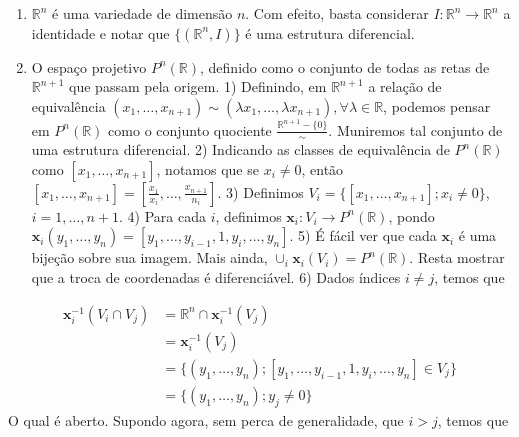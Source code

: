 \begin{examples}
    \label{loc:2.1_:_def_1_:_variedade_diferenciável.exemplos_de_variedades.}
    \begin{enumerate}
        \item $\mathbb{R}^{n}$ é uma variedade de dimensão $n$. Com efeito, basta considerar $I:\mathbb{R}^{n}\to \mathbb{R}^{n}$ a identidade e notar que $\{ (\mathbb{R}^{n}, I) \}$ é uma estrutura diferencial.
        \item  O espaço projetivo $P^{n}(\mathbb{R})$, definido como o conjunto de todas as retas de $\mathbb{R}^{n+1}$ que passam pela origem.
              1) Definindo, em $\mathbb{R}^{n+1}$ a relação de equivalência $(x_{1}, \dots, x_{n+1}) \sim (\lambda x_{1}, \dots, \lambda x_{n+1}), \forall \lambda \in \mathbb{R}$, podemos pensar em $P^{n}(\mathbb{R})$ como o conjunto quociente $\frac{\mathbb{R}^{n+1}-\{ 0 \}}{\sim}$. Muniremos tal conjunto de uma estrutura diferencial.
              2) Indicando as classes de equivalência de $P^{n}(\mathbb{R})$ como $[x_{1}, \dots, x_{n+1}]$, notamos que se $x_{i}\neq{0}$, então $[x_{1}, \dots, x_{n+1}]=\left[ \frac{x_{1}}{x_{i}}, \dots, \frac{x_{n+1}}{n_{i}} \right]$.
              3) Definimos $V_{i}=\{ [x_{1}, \dots, x_{n+1}]; x_{i}\neq 0 \}$, $i =1, \dots, n+1$.
              4) Para cada $i$, definimos $\mathbf{x}_{i}:V_{i}\to P^{n}(\mathbb{R})$, pondo $\mathbf{x}_{i}(y_{1}, \dots, y_{n})=[y_{1}, \dots, y_{i-1}, 1, y_{i}, \dots, y_{n}]$.
              5) É fácil ver que cada $\mathbf{x}_{i}$ é uma bijeção sobre sua imagem. Mais ainda, $\cup_{i}\mathbf{x}_{i}(V_{i})=P^{n}(\mathbb{R})$. Resta mostrar que a troca de coordenadas é diferenciável.
              6) Dados índices $i \neq j$, temos que
    \end{enumerate}
    \begin{align*}
        \mathbf{x}_{i}^{-1}(V_{i}\cap V_{j}) & =\mathbb{R}^{n}\cap \mathbf{x}_{i}^{-1}(V_{j})                                           \\
                                             & = \mathbf{x}_{i}^{-1}(V_{j})                                                             \\
                                             & = \{ (y_{1}, \dots, y_{n}); [y_{1}, \dots, y_{i-1}, 1, y_{i}, \dots, y_{n}] \in V_{j} \} \\
                                             & = \{ (y_{1}, \dots, y_{n});y_{j} \neq 0 \}
    \end{align*}
    O qual é aberto.
    Supondo agora, sem perca de generalidade, que $i>j$, temos que

\end{examples}
